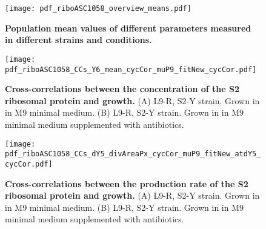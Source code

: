 \begin{figure}
    \centering
    \texttt{[image: pdf\_riboASC1058\_overview\_means.pdf]}
    \caption{ 
        \textbf{Population mean values of different parameters measured in different strains and conditions.}
    }
    \label{fig:ribo:meansRR}
\end{figure}


\begin{figure}
    \centering
    \texttt{[image: pdf\_riboASC1058\_CCs\_Y6\_mean\_cycCor\_muP9\_fitNew\_cycCor.pdf]}
    \caption{ 
        \textbf{Cross-correlations between the concentration of the S2 ribosomal protein and growth.}
        (A) L9-R, S2-Y strain. Grown in in M9 minimal medium.
        (B) L9-R, S2-Y strain. Grown in in M9 minimal medium supplemented with antibiotics. 
    }
    \label{fig:ribo:CCsEmuS2}
\end{figure}

\begin{figure}
    \centering
    \texttt{[image: pdf\_riboASC1058\_CCs\_dY5\_divAreaPx\_cycCor\_muP9\_fitNew\_atdY5\_cycCor.pdf]}
    \caption{ 
        \textbf{Cross-correlations between the production rate of the S2 ribosomal protein and growth.}
        (A) L9-R, S2-Y strain. Grown in in M9 minimal medium.
        (B) L9-R, S2-Y strain. Grown in in M9 minimal medium supplemented with antibiotics. 
%
    }
    \label{fig:ribo:CCsPmuS2}
\end{figure}

